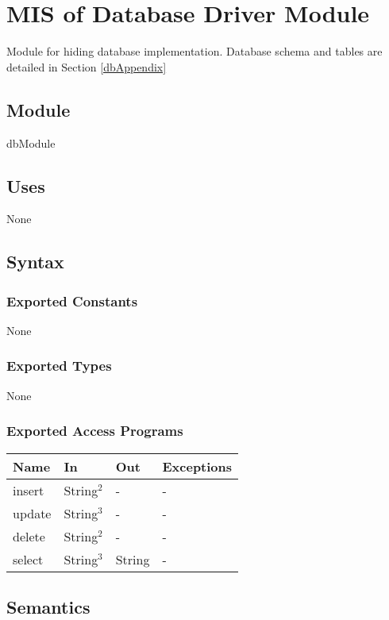 \documentclass[12pt, titlepage]{article}
\begin{document}
\newpage

\section{MIS of Database Driver Module} \label{mDBDriver}
Module for hiding database implementation. Database schema and tables are detailed in Section \ref{dbAppendix}

\subsection{Module}
dbModule

\subsection{Uses}
None

\subsection{Syntax}

\subsubsection{Exported Constants}
None

\subsubsection{Exported Types}
None

\subsubsection{Exported Access Programs}

\begin{center}
\begin{tabular}{p{4cm} p{4cm} p{4cm} p{3cm}}
\hline
\textbf{Name} & \textbf{In} & \textbf{Out} & \textbf{Exceptions} \\
\hline
insert & String$^2$ & - & - \\
update & String$^3$ & - & - \\
delete & String$^2$ & - & - \\
select & String$^3$ & String & - \\
\hline
\end{tabular}
\end{center}

\subsection{Semantics}
\end{document}
